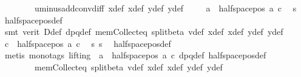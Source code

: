 \begin{isabellebody}
\ \ \ \ \ \ \ \ uminus{\isacharunderscore}{\kern0pt}add{\isacharunderscore}{\kern0pt}conv{\isacharunderscore}{\kern0pt}diff\ x{}{\isacharunderscore}{\kern0pt}def\ x{}{\isacharunderscore}{\kern0pt}def\ y{}{\isacharunderscore}{\kern0pt}def\ y{}{\isacharunderscore}{\kern0pt}def{\isacharparenright}{\kern0pt}\isanewline
\ \ \isamarkupfalse%
\ \ {\isachardoublequoteopen}a\ {\isasymin}\ halfspace{\isacharunderscore}{\kern0pt}pos\ a\ c{\isachardoublequoteclose}\ \isamarkupfalse%
\ s{\isacharunderscore}{\kern0pt}{}\ \isamarkupfalse%
\ halfspace{\isacharunderscore}{\kern0pt}pos{\isacharunderscore}{\kern0pt}def\isanewline
\ \ \ \ \isamarkupfalse%
\ {\isacharparenleft}{\kern0pt}smt\ {\isacharparenleft}{\kern0pt}verit{\isacharparenright}{\kern0pt}\ D{\isacharunderscore}{\kern0pt}def\ dpq{\isacharunderscore}{\kern0pt}def\ mem{\isacharunderscore}{\kern0pt}Collect{\isacharunderscore}{\kern0pt}eq\ split{\isacharunderscore}{\kern0pt}beta\ v{\isacharunderscore}{\kern0pt}def\ x{}{\isacharunderscore}{\kern0pt}def\ x{}{\isacharunderscore}{\kern0pt}def\ y{}{\isacharunderscore}{\kern0pt}def\ y{}{\isacharunderscore}{\kern0pt}def{\isacharparenright}{\kern0pt}\isanewline
\ \ \isamarkupfalse%
\ {\isachardoublequoteopen}c\ {\isasymin}\ halfspace{\isacharunderscore}{\kern0pt}pos\ a\ c{\isachardoublequoteclose}\ \isamarkupfalse%
\ s{\isacharunderscore}{\kern0pt}{}\ s{\isacharunderscore}{\kern0pt}{}\ \isamarkupfalse%
\ halfspace{\isacharunderscore}{\kern0pt}pos{\isacharunderscore}{\kern0pt}def\isanewline
\ \ \ \ \isamarkupfalse%
\ {\isacharparenleft}{\kern0pt}metis\ {\isacharparenleft}{\kern0pt}mono{\isacharunderscore}{\kern0pt}tags{\isacharcomma}{\kern0pt}\ lifting{\isacharparenright}{\kern0pt}\ \ {\isacartoucheopen}a\ {\isasymin}\ halfspace{\isacharunderscore}{\kern0pt}pos\ a\ c{\isacartoucheclose}\ dpq{\isacharunderscore}{\kern0pt}def\ halfspace{\isacharunderscore}{\kern0pt}pos{\isacharunderscore}{\kern0pt}def\isanewline
\ \ \ \ \ \ \ \ mem{\isacharunderscore}{\kern0pt}Collect{\isacharunderscore}{\kern0pt}eq\ split{\isacharunderscore}{\kern0pt}beta\ v{\isacharunderscore}{\kern0pt}def\ x{}{\isacharunderscore}{\kern0pt}def\ x{}{\isacharunderscore}{\kern0pt}def\ y{}{\isacharunderscore}{\kern0pt}def\ y{}{\isacharunderscore}{\kern0pt}def{\isacharparenright}{\kern0pt}\isanewline

\end{isabellebody}
